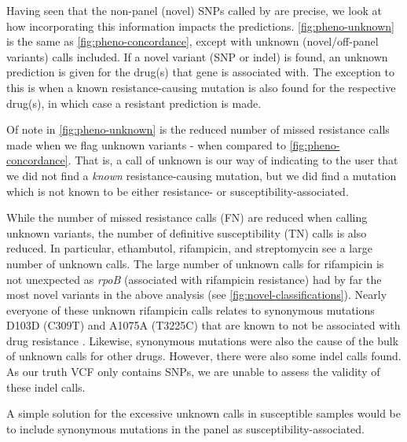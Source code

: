 Having seen that the non-panel (novel) SNPs called by \drprg{} are precise, we look at how incorporating this information impacts the predictions. \autoref{fig:pheno-unknown} is the same as \autoref{fig:pheno-concordance}, except with unknown (novel/off-panel variants) calls included. If a novel variant (SNP or indel) is found, an unknown prediction is given for the drug(s) that gene is associated with. The exception to this is when a known resistance-causing mutation is also found for the respective drug(s), in which case a resistant prediction is made.

Of note in \autoref{fig:pheno-unknown} is the reduced number of missed resistance calls made when we flag unknown variants - when compared to \autoref{fig:pheno-concordance}. That is, a call of unknown is our way of indicating to the user that we did not find a \emph{known} resistance-causing mutation, but we did find a mutation which is not known to be either resistance- or susceptibility-associated.

While the number of missed resistance calls (FN) are reduced when calling unknown variants, the number of definitive susceptibility (TN) calls is also reduced. In particular, ethambutol, rifampicin, and streptomycin see a large number of unknown calls. The large number of unknown calls for rifampicin is not unexpected as \textit{rpoB} (associated with rifampicin resistance) had by far the most novel variants in the above analysis (see \autoref{fig:novel-classifications}). Nearly everyone of these unknown rifampicin calls relates to synonymous mutations D103D (C309T) and A1075A (T3225C) that are known to not be associated with drug resistance \cite{Jagielski2018}. Likewise, synonymous mutations were also the cause of the bulk of unknown calls for other drugs. However, there were also some indel calls found. As our truth VCF only contains SNPs, we are unable to assess the validity of these indel calls.

A simple solution for the excessive unknown calls in susceptible samples would be to include synonymous mutations in the panel as susceptibility-associated.

